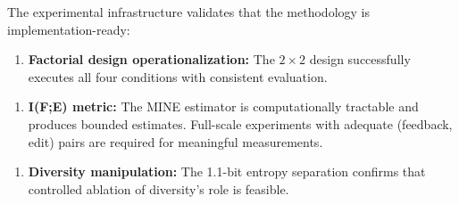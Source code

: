 
The experimental infrastructure validates that the methodology is implementation-ready:

\begin{enumerate}
\item \textbf{Factorial design operationalization:} The $2\times 2$ design successfully executes all four conditions with consistent evaluation.
\end{enumerate}

\begin{enumerate}
\item \textbf{I(F;E) metric:} The MINE estimator is computationally tractable and produces bounded estimates. Full-scale experiments with adequate (feedback, edit) pairs are required for meaningful measurements.
\end{enumerate}

\begin{enumerate}
\item \textbf{Diversity manipulation:} The 1.1-bit entropy separation confirms that controlled ablation of diversity's role is feasible.
\end{enumerate}
